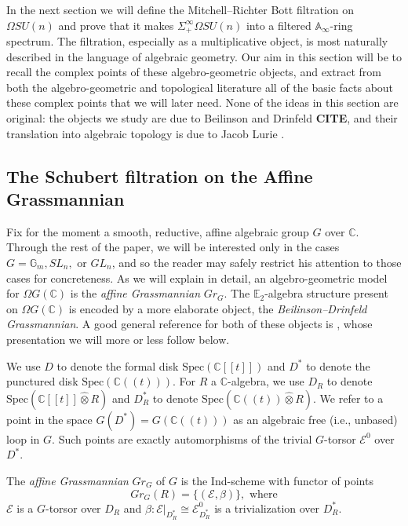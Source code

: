 

In the next section we will define the Mitchell--Richter Bott filtration on $\Omega SU(n)$ and prove that it makes $\Sigma^{\infty}_+ \Omega SU(n)$ into a filtered $\mathbb{A}_\infty$-ring spectrum.  The filtration, especially as a multiplicative object, is most naturally described in the language of algebraic geometry.  Our aim in this section will be to recall the complex points of these algebro-geometric objects, and extract from both the algebro-geometric and topological literature all of the basic facts about these complex points that we will later need.  None of the ideas in this section are original: the objects we study are due to Beilinson and Drinfeld \textbf{CITE}, and their translation into algebraic topology is due to Jacob Lurie  \cite[\S 5.5]{HA}.

\subsection{The Schubert filtration on the Affine Grassmannian}

Fix for the moment a smooth, reductive, affine algebraic group $G$ over $\mathbb{C}$.  Through the rest of the paper, we will be interested only in the cases $G=\mathbb{G}_m,SL_n,$ or $GL_n$, and so the reader may safely restrict his attention to those cases for concreteness.  As we will explain in detail, an algebro-geometric model for $\Omega G(\mathbb{C})$ is the \textit{affine Grassmannian} $Gr_G$.  The $\mathbb{E}_2$-algebra structure present on $\Omega G(\mathbb{C})$ is encoded by a more elaborate object, the \textit{Beilinson--Drinfeld Grassmannian}.  A good general reference for both of these objects is \cite{Zhu}, whose presentation we will more or less follow below.

We use $D$ to denote the formal disk $\text{Spec}(\mathbb{C}[[t]])$ and $D^*$ to denote the punctured disk $\text{Spec}(\mathbb{C}((t)))$.  For $R$ a $\mathbb{C}$-algebra, we use $D_R$ to denote $\text{Spec}(\mathbb{C}[[t]] \hat{\otimes} R)$ and $D^*_R$ to denote $\text{Spec}(\mathbb{C}((t)) \hat{\otimes} R)$.  We refer to a point in the space $G(D^*)=G(\mathbb{C}((t)))$ as an algebraic free (i.e., unbased) loop in $G$.  Such points are exactly automorphisms of the trivial $G$-torsor $\mathcal{E}^0$ over $D^*$.

\begin{dfn}
The \textit{affine Grassmannian} $Gr_G$ of $G$ is the Ind-scheme with functor of points
$$Gr_G(R) = \{(\mathcal{E},\beta)\},\text{ where}$$
$\mathcal{E}$ is a $G$-torsor over $D_{R}$ and $\beta:\mathcal{E}|_{D^*_{R}} \cong \mathcal{E}^0_{D^*_{R}}$ is a trivialization over $D^*_{R}$.
\end{dfn}

